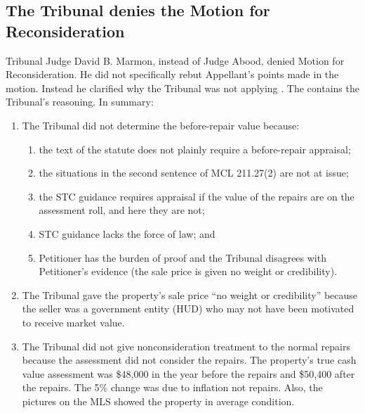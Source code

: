 \documentclass[12pt,\documentclassflag]{michiganCourtOfAppealsBrief}
\begin{document}
\subsection{The Tribunal denies the Motion for Reconsideration}

Tribunal Judge David B. Marmon, instead of Judge Abood, denied Motion for Reconsideration. He did not specifically rebut Appellant's points made in the motion. Instead he clarified why the Tribunal was not applying \mathieuGast. The \reconsiderationDenied[2] contains the Tribunal's reasoning. In summary:

\begin{enumerate}
  
\item The Tribunal did not determine the before-repair value because:
  \begin{enumerate}
  \item the text of the statute does not plainly require a before-repair appraisal;
  \item the situations in the second sentence of MCL 211.27(2) are not at issue;
  \item the STC guidance requires appraisal if the value of the repairs are on the assessment roll, and here they are not;
  \item STC guidance lacks the force of law; and
  \item Petitioner has the burden of proof and the Tribunal disagrees with Petitioner's evidence (the sale price is given no weight or credibility).
  \end{enumerate}
  
\item The Tribunal gave the property's sale price ``no weight or credibility'' because the seller was a government entity (HUD) who may not have been motivated to receive market value.
  
\item The Tribunal did not give nonconsideration treatment to the normal repairs because the assessment did not consider the repairs. The property's true cash value assessment was \$48,000 in the year before the repairs and \$50,400 after the repairs. The 5\% change was due to inflation not repairs. Also, the pictures on the MLS showed the property in average condition.

\end{enumerate}

\end{document}
